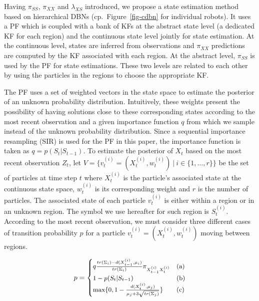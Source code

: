 \documentclass[runningheads]{llncs}
\begin{document}
Having $\pi_{SS}$, $\pi_{XX}$ and $\lambda_{XS}$ introduced, we propose a state estimation method based on hierarchical DBNs (cp.~Figure~\ref{fig-cdbn} for individual robots). It uses a PF which is coupled with a bank of KFs at the abstract state level (a dedicated KF for each region) and the continuous state level jointly for state estimation. At the continuous level, states are inferred from observations and  $\pi_{XX}$ predictions are computed by the KF associated with each region. At the abstract level, $\pi_{SS}$ is used by the PF for state estimations. These two levels are related to each other by using the particles in the regions to choose the appropriate KF.
    
The PF uses a set of weighted vectors in the state space to estimate the posterior of an unknown probability distribution. Intuitively, these weights present the possibility of having solutions close to these corresponding states according to the most recent observation and a given importance function $q$ from which we sample instead of the unknown probability distribution. Since a sequential importance resampling (SIR) is used for the PF in this paper, the importance function is taken as $q=p(S_t|S_{t-1})$. To estimate the posterior of $X_t$ based on the most recent observation $Z_t$, let $V = \{v_{t}^{(i)}=(X_{t}^{(i)},w_{t}^{(i)}) \ | \ i \in \{1, \dots, r\}\}$ be the set of particles at time step $t$  where $X_{t}^{(i)}$ is the particle's associated state at the continuous state space, $w_{t}^{(i)}$ is its corresponding weight and $r$ is the number of particles. The associated state of each particle $v_{t}^{(i)}$ is either within a region or in an unknown region. The symbol we use hereafter for such region is $S_{t}^{(i)}$.  According to the most recent observation, we must consider three different cases of transition probability $p$ for a particle $v_{t}^{(i)}=(X_{t}^{(i)},w_{t}^{(i)})$ moving between regions. 

\begin{equation}
    \small
    p=
    \begin{cases}
    q\frac{tr(\Sigma_i)-d(X_{t-1}^{(i)},\mu_i)}{tr(\Sigma_i)}\pi_{X_{t-1}^{(i)}X_{t}^{(i)}} & \text{(a)}
    \\
    1-p(S_t|S_{t-1}) & \text{(b)}
    \\
    \max\{0, 1-\frac{d(X_{t}^{(i)},\mu_j)}{\mu_j+3\sqrt{tr(\Sigma_j)}}\} & \text{(c)}
    \end{cases}
    \label{eq-particle-movements}
\end{equation}
\end{document}
